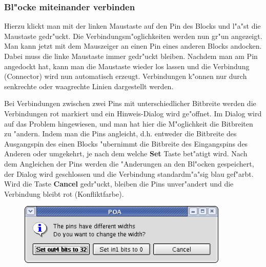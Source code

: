 \documentclass[a4paper,titlepage,12pt,ngerman]{scrbook}
\begin{document}
\subsubsection{Bl"ocke miteinander verbinden}
Hierzu klickt man mit der linken Maustaste auf den Pin des Blocks und l"a"st die Maustaste gedr"uckt. Die Verbindungsm"oglichkeiten werden nun gr"un angezeigt. Man kann jetzt mit dem Mauszeiger an einen Pin eines anderen Blocks andocken. Dabei muss die linke Maustaste immer gedr"uckt bleiben. Nachdem man am Pin angedockt hat, kann man die Maustaste wieder los lassen und die Verbindung (Connector) wird nun automatisch erzeugt. Verbindungen k"onnen nur durch senkrechte oder waagrechte Linien dargestellt werden.\par
Bei Verbindungen zwischen zwei Pins mit unterschiedlicher Bitbreite werden die Verbindungen rot markiert und ein Hinweis-Dialog wird ge"offnet. Im Dialog wird auf das Problem hingewiesen, und man hat hier die M"oglichkeit die Bitbreiten zu "andern. Indem man die Pins angleicht, d.h. entweder die Bitbreite des Ausgangspin des einen Blocks "ubernimmt die Bitbreite des Eingangspins des Anderen oder umgekehrt, je nach dem welche {\bf Set} Taste bet"atigt wird. Nach dem Angleichen der Pins werden die "Anderungen an den Bl"ocken gespeichert, der Dialog wird geschlossen und die Verbindung standardm"a"sig blau gef"arbt.\newline
Wird die Taste {\bf Cancel} gedr"uckt, bleiben die Pins unver"andert und die Verbindung bleibt rot (Konfliktfarbe).

\begin{figure}[htbp]

\begin{center}

\includegraphics[width=10cm]{Pin}


\end{center}

\end{figure}
\end{document}
